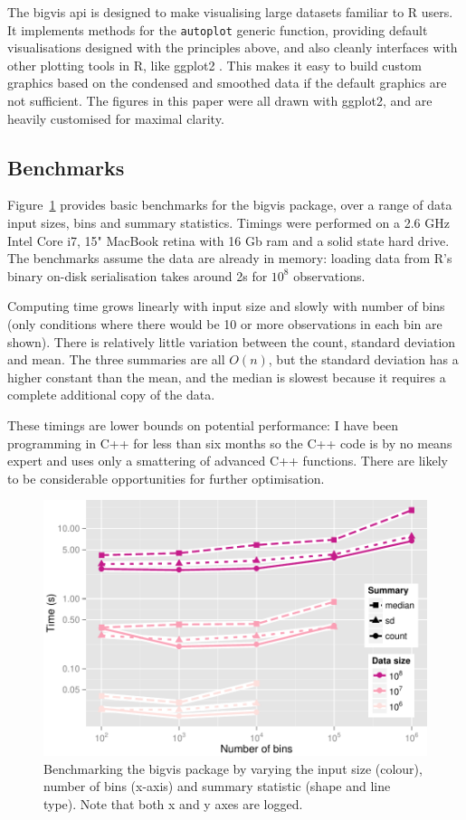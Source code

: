 \documentclass[journal]{vgtc}                %
\begin{document}
The bigvis {\sc api} is designed to make visualising large datasets familiar to R users. It implements methods for the {\tt autoplot} generic function, providing default visualisations designed with the principles above, and also cleanly interfaces with other plotting tools in R, like ggplot2 \citep{me:ggplot2,wickham:2007d}. This makes it easy to build custom graphics based on the condensed and smoothed data if the default graphics are not sufficient. The figures in this paper were all drawn with ggplot2, and are heavily customised for maximal clarity.

\subsection{Benchmarks}
\label{sub:benchmarks}

Figure~\ref{fig:benchmark} provides basic benchmarks for the bigvis package, over a range of data input sizes, bins and summary statistics. Timings were performed on a 2.6 GHz Intel Core i7, 15" MacBook retina with 16 Gb ram and a solid state hard drive. The benchmarks assume the data are already in memory: loading data from R's binary on-disk serialisation takes around 2s for $10^8$ observations.

Computing time grows linearly with input size and slowly with number of bins (only conditions where there would be 10 or more observations in each bin are shown). There is relatively little variation between the count, standard deviation and mean. The three summaries are all $O(n)$, but the standard deviation has a higher constant than the mean, and the median is slowest because it requires a complete additional copy of the data. 

These timings are lower bounds on potential performance: I have been programming in C++ for less than six months so the C++ code is by no means expert and uses only a smattering of advanced C++ functions. There are likely to be considerable opportunities for further optimisation.

\begin{figure}
  \centering
   \includegraphics[width=\linewidth]{benchmark}
 \caption{Benchmarking the bigvis package by varying the input size (colour), number of bins (x-axis) and summary statistic (shape and line type). Note that both x and y axes are logged.}
 \label{fig:benchmark}
\end{figure}
\end{document}
